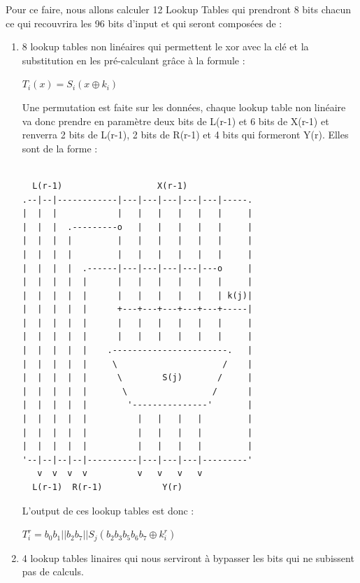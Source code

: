 \documentclass[a4paper,12pt]{article}
\begin{document}
				
Pour ce faire, nous allons calculer 12 Lookup Tables qui prendront 8 bits chacun ce qui recouvrira les 96 bits d'input et qui seront composées de :
\bigskip
\begin{enumerate}
\item 8 lookup tables non linéaires qui permettent le xor avec la clé et la substitution en les pré-calculant grâce à la formule :

\medskip
\begin{center}
$T_i(x) = S_i(x \oplus k_i)$ 
\end{center}
\medskip

Une permutation est faite sur les données, chaque lookup table non linéaire va donc prendre en paramètre deux bits de L(r-1) et 6 bits de X(r-1) et renverra 2 bits de L(r-1), 2 bits de R(r-1) et 4 bits qui formeront Y(r). Elles sont de la forme :

\begin{Verbatim}[samepage=true]

  L(r-1)                   X(r-1)
.--|--|------------|---|---|---|---|---|-----.
|  |  |            |   |   |   |   |   |     |
|  |  |  .---------o   |   |   |   |   |     |
|  |  |  |         |   |   |   |   |   |     |   
|  |  |  |         |   |   |   |   |   |     |  
|  |  |  |  .------|---|---|---|---|---o     | 
|  |  |  |  |      |   |   |   |   |   |     | 
|  |  |  |  |      |   |   |   |   |   | k(j)|  
|  |  |  |  |      +---+---+---+---+---+-----|  
|  |  |  |  |      |   |   |   |   |   |     | 
|  |  |  |  |      |   |   |   |   |   |     | 
|  |  |  |  |    .-----------------------.   |              
|  |  |  |  |     \                     /    |              
|  |  |  |  |      \        S(j)       /     |              
|  |  |  |  |       \                 /      |               
|  |  |  |  |        '---------------'       |               
|  |  |  |  |          |   |   |   |         |     
|  |  |  |  |          |   |   |   |         | 
|  |  |  |  |          |   |   |   |         |   
'--|--|--|--|----------|---|---|---|---------'
   v  v  v  v          v   v   v   v 
  L(r-1)  R(r-1)            Y(r)

\end{Verbatim}	


L'output de ces lookup tables est donc :
\medskip
\begin{center}
$T_i^r = b_0 b_1||b_2 b_7||S_j(b_2 b_3 b_5 b_6 b_7 \oplus k_i^r)$ 
\end{center}
\medskip

\item 4 lookup tables linaires qui nous serviront à bypasser les bits qui ne subissent pas de calculs.


\end{enumerate}
\end{document}
